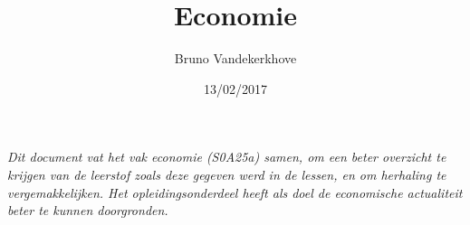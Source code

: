 \title{Economie}
\author{Bruno Vandekerkhove}
\date{13/02/2017}
\maketitle

\begin{center}
\textit{Dit document vat het vak economie (S0A25a) samen, om een beter overzicht te krijgen van de leerstof zoals deze gegeven werd in de lessen, en om herhaling te vergemakkelijken. Het opleidingsonderdeel heeft als doel de economische actualiteit beter te kunnen doorgronden.}
\end{center}